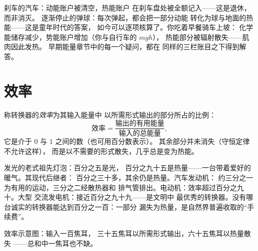 \begin{example}[核算示例]\label{ex:g9:energy-conversions:audits}
刹车的汽车：动能账户被清空，热能账户
在刹车盘处被全额记入——这是退休，而非消灭。
逐渐停止的弹球：每次弹起，都会把一部分动能
转化为球与地面的热能——这是童年时代的答案，
如今可以逐项核算了。你吃着早餐骑车上坡：
化学能储存减少，势能账户增加（你与自行车的 $m g h$），
热能部分被辐射散失——肌肉因此发热。
早期能量章节中的每一个疑问，都在
同样的三栏账目之下得到解答。
\end{example}

\section{效率}

\begin{definition}[效率]\label{def:g9:energy-conversions:efficiency}
称转换器的\emph{效率}为其输入能量中
以所需形式输出的部分所占的比例：
\[
\text{效率} =
\frac{\text{输出的有用能量}}{\text{输入的总能量}},
\]
它是介于 $0$ 与 $1$ 之间的数（也可用百分数表示）。
其余部分并未消失（守恒定律不允许这样），
而是以不需要的形式散失，几乎总是变为热能。
\end{definition}

\begin{example}[成绩单]\label{ex:g9:energy-conversions:reportcards}
发光的老式祖先灯泡：百分之五是光，
百分之九十五是热量——一台带着爱好的暖气。其现代后继者：
百分之三十多，其余仍是热量。汽车发动机：
约三分之一为有用的运动，三分之二经散热器和
排气管排出。电动机：效率超过百分之九十。大型
交流发电机：接近百分之九十九——是文明中
最优秀的转换器。没有哪台诚实的转换器能达到百分之一百：一部分
漏失为热量，是自然界普遍收取的“手续费”。
\end{example}

\begin{omfigure}

{\small 效率示意图：输入一百焦耳，
三十五焦耳以所需形式输出，六十五焦耳以热量散失
——总和中一焦耳也不缺。}
\end{omfigure}

